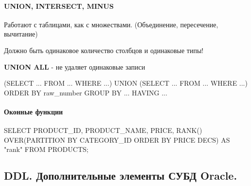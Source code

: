 \documentclass[a5paper,10pt]{article}
\begin{document}
\begin{lstlistening}
\begin{lstlistening}
\begin{lstlistening}
\begin{lstlistening}
			\paragraph{UNION, INTERSECT, MINUS}
				Работают с таблицами, как с множествами. (Объединение, пересечение, вычитание)
				\begin{framed}
					Должно быть одинаковое количество столбцов и одинаковые типы!
				\end{framed}
				\textbf{UNION ALL} - не удаляет одинаковые записи
				\begin{lstlistening}
					(SELECT ... FROM ... WHERE ...)
					UNION
					(SELECT ... FROM ... WHERE ...)
					ORDER BY raw\_number
					GROUP BY ...
					HAVING ...
				\end{lstlistening}

			\paragraph{Оконные функции}
				\begin{lstlistening}
					SELECT PRODUCT\_ID, PRODUCT\_NAME, PRICE,
						   RANK() OVER(PARTITION BY CATEGORY\_ID ORDER BY PRICE DECS) AS "rank"
					FROM PRODUCTS;
				\end{lstlistening}

		\subsection{DDL. Дополнительные элементы СУБД Oracle.}

\end{lstlistening}
\end{lstlistening}
\end{lstlistening}
\end{lstlistening}
\end{document}
